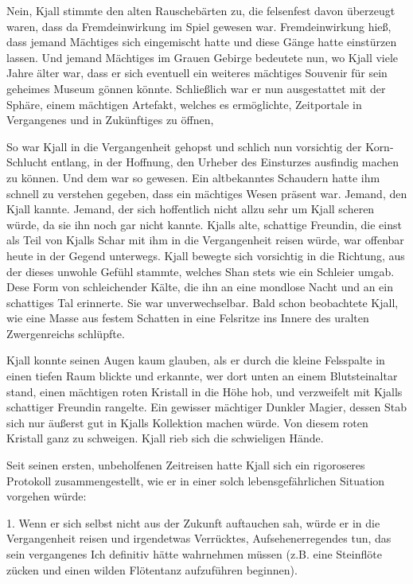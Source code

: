 Nein, Kjall stimmte den alten Rauschebärten zu, die felsenfest davon überzeugt waren, dass da Fremdeinwirkung im Spiel gewesen war. Fremdeinwirkung hieß, dass jemand Mächtiges sich eingemischt hatte und diese Gänge hatte einstürzen lassen. Und jemand Mächtiges im Grauen Gebirge bedeutete nun, wo Kjall viele Jahre älter war, dass er sich eventuell ein weiteres mächtiges Souvenir für sein geheimes Museum gönnen könnte. Schließlich war er nun ausgestattet mit der Sphäre, einem mächtigen Artefakt, welches es ermöglichte, Zeitportale in Vergangenes und in Zukünftiges zu öffnen,

So war Kjall in die Vergangenheit gehopst und schlich nun vorsichtig der Korn-Schlucht entlang, in der Hoffnung, den Urheber des Einsturzes ausfindig machen zu können. Und dem war so gewesen. Ein altbekanntes Schaudern hatte ihm schnell zu verstehen gegeben, dass ein mächtiges Wesen präsent war. Jemand, den Kjall kannte. Jemand, der sich hoffentlich nicht allzu sehr um Kjall scheren würde, da sie ihn noch gar nicht kannte. Kjalls alte, schattige Freundin, die einst als Teil von Kjalls Schar mit ihm in die Vergangenheit reisen würde, war offenbar heute in der Gegend unterwegs. Kjall bewegte sich vorsichtig in die Richtung, aus der dieses unwohle Gefühl stammte, welches Shan stets wie ein Schleier umgab. Dese Form von schleichender Kälte, die ihn an eine mondlose Nacht und an ein schattiges Tal erinnerte. Sie war unverwechselbar. Bald schon beobachtete Kjall, wie eine Masse aus festem Schatten in eine Felsritze ins Innere des uralten Zwergenreichs schlüpfte.

Kjall konnte seinen Augen kaum glauben, als er durch die kleine Felsspalte in einen tiefen Raum blickte und erkannte, wer dort unten an einem Blutsteinaltar stand, einen mächtigen roten Kristall in die Höhe hob, und verzweifelt mit Kjalls schattiger Freundin rangelte. Ein gewisser mächtiger Dunkler Magier, dessen Stab sich nur äußerst gut in Kjalls Kollektion machen würde. Von diesem roten Kristall ganz zu schweigen. Kjall rieb sich die schwieligen Hände.

Seit seinen ersten, unbeholfenen Zeitreisen hatte Kjall sich ein rigoroseres Protokoll zusammengestellt, wie er in einer solch lebensgefährlichen Situation vorgehen würde:

1. Wenn er sich selbst nicht aus der Zukunft auftauchen sah, würde er in die Vergangenheit reisen und irgendetwas Verrücktes, Aufsehenerregendes tun, das sein vergangenes Ich definitiv hätte wahrnehmen müssen (z.B. eine Steinflöte zücken und einen wilden Flötentanz aufzuführen beginnen).


